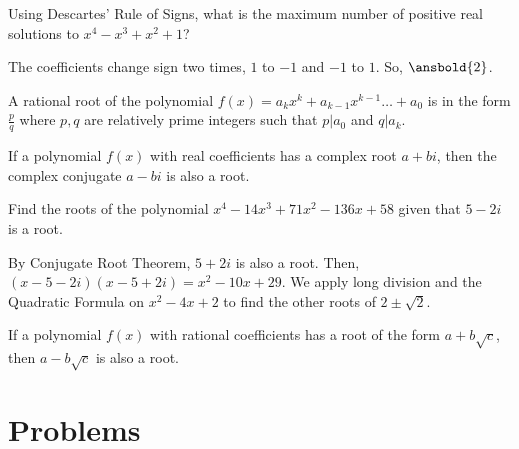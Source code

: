 \documentclass{article}
\begin{document}
\begin{exam}
Using Descartes' Rule of Signs, what is the maximum number of positive real solutions to $x^4-x^3+x^2+1$?
\end{exam}

\begin{sol}
The coefficients change sign two times, $1$ to $-1$ and $-1$ to $1$. So, $\ansbold{2}$.
\end{sol}

\begin{theo}
A rational root of the polynomial $f(x)=a_{k}x^{k}+a_{k-1}x^{k-1}\ldots + a_{0}$ is in the form $\frac{p}{q}$ where $p,q$ are relatively prime integers such that $p|a_{0}$ and $q|a_{k}$.
\end{theo}

\begin{theo}
If a polynomial $f(x)$ with real coefficients has a complex root $a+bi$, then the complex conjugate $a-bi$ is also a root.
\end{theo}

\begin{exam}
Find the roots of the polynomial $x^4-14x^3+71x^2-136x+58$ given that $5-2i$ is a root.
\end{exam}

\begin{sol}
By Conjugate Root Theorem, $5+2i$ is also a root. Then, $(x-5-2i)(x-5+2i)=x^2-10x+29$. We apply long division and the Quadratic Formula on $x^2-4x+2$ to find the other roots of $2\pm \sqrt{2}$.
\end{sol}


\begin{theo}
If a polynomial $f(x)$ with rational coefficients has a root of the form $a+b\sqrt{c}$, then $a-b\sqrt{c}$ is also a root.
\end{theo}

\newpage
\section{Problems}



\end{document}
